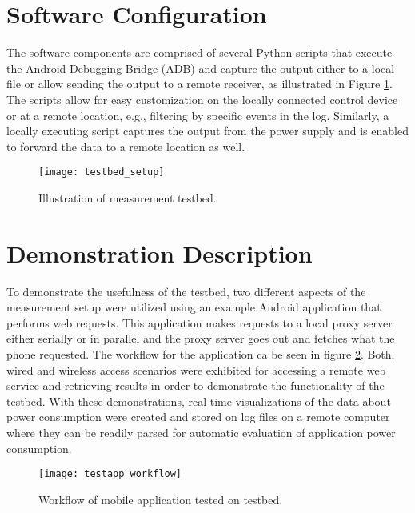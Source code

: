 \section*{Software Configuration}
The software components are comprised of several Python scripts that execute the Android Debugging Bridge (ADB) and capture the output either to a local file or allow sending the output to a remote receiver, as illustrated in  Figure \ref{fig:testbed_setup}. The scripts allow for easy customization on the locally connected control device or at a remote location, e.g., filtering by specific events in the log. Similarly, a locally executing script captures the output from the power supply and is enabled to forward the data to a remote location as well.

\begin{figure}
\centering
\texttt{[image: testbed\_setup]}
\caption{Illustration of measurement testbed.}
\label{fig:testbed_setup}
\end{figure}

\section*{Demonstration Description}
To demonstrate the usefulness of the testbed, two different aspects of the measurement setup were utilized using an example Android application that performs web requests. This application makes requests to a local proxy server either serially or in parallel and the proxy server goes out and fetches what the phone requested.  The workflow for the application ca be seen in figure \ref{fig:testapp_workflow}. Both, wired and wireless access scenarios were exhibited for accessing a remote web service and retrieving results in order to demonstrate the functionality of the testbed. With these demonstrations, real time visualizations of the data about power consumption were created and stored on log files on a remote computer where they can be readily parsed for automatic evaluation  of application power consumption.

\begin{figure}
\centering
\texttt{[image: testapp\_workflow]}
\caption{Workflow of mobile application tested on testbed.}
\label{fig:testapp_workflow}
\end{figure}


